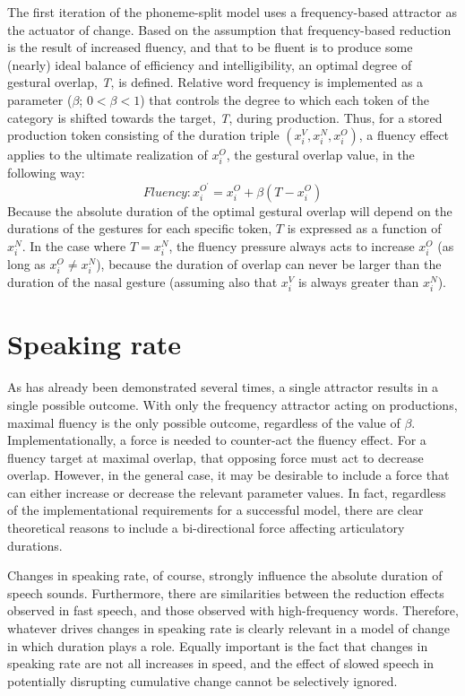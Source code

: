 The first iteration of the phoneme-split model uses a frequency-based
attractor as the actuator of change. Based on the assumption that
frequency-based reduction is the result of increased fluency, and
that to be fluent is to produce some (nearly) ideal balance of efficiency
and intelligibility, an optimal degree of gestural overlap, \emph{T},
is defined. Relative word frequency is implemented as a parameter
($\beta$; $0<\beta<1$) that controls the degree to which each token
of the category is shifted towards the target, \emph{T}, during production.
Thus, for a stored production token consisting of the duration triple
$(x_{i}^{V},x_{i}^{N},x_{i}^{O})$, a fluency effect applies to the
ultimate realization of $x_{i}^{O}$, the gestural overlap value,
in the following way: 
\begin{equation}
\textit{Fluency}:x_{i}^{O^{\prime}}=x_{i}^{O}+\beta(T-x_{i}^{O})\label{eq:Frequency attractor}
\end{equation}
Because the absolute duration of the optimal gestural overlap will
depend on the durations of the gestures for each specific token, $T$
is expressed as a function of $x_{i}^{N}$. In the case where $T=x_{i}^{N}$,
the fluency pressure always acts to increase $x_{i}^{O}$ (as long
as $x_{i}^{O}\neq x_{i}^{N}$), because the duration of overlap can
never be larger than the duration of the nasal gesture (assuming also
that $x_{i}^{V}$ is always greater than $x_{i}^{N}$). 

\section{Speaking rate}

As has already been demonstrated several times, a single attractor
results in a single possible outcome. With only the frequency attractor
acting on productions, maximal fluency is the only possible outcome,
regardless of the value of $\beta$. Implementationally, a force is
needed to counter-act the fluency effect. For a fluency target at
maximal overlap, that opposing force must act to decrease overlap.
However, in the general case, it may be desirable to include a force
that can either increase or decrease the relevant parameter values.
In fact, regardless of the implementational requirements for a successful
model, there are clear theoretical reasons to include a bi-directional
force affecting articulatory durations. 

Changes in speaking rate, of course, strongly influence the absolute
duration of speech sounds. Furthermore, there are similarities between
the reduction effects observed in fast speech, and those observed
with high-frequency words. Therefore, whatever drives changes in speaking
rate is clearly relevant in a model of change in which duration plays
a role. Equally important is the fact that changes in speaking rate
are not all increases in speed, and the effect of slowed speech in
potentially disrupting cumulative change cannot be selectively ignored. 

